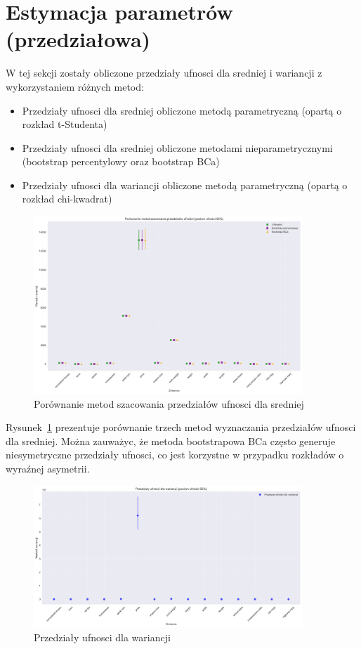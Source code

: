\documentclass[12pt,a4paper]{article}
\begin{document}
\section{Estymacja parametrów (przedziałowa)}

W tej sekcji zostały obliczone przedziały ufnosci dla sredniej i wariancji z wykorzystaniem różnych metod:
\begin{itemize}
    \item Przedziały ufnosci dla sredniej obliczone metodą parametryczną (opartą o rozkład t-Studenta)
    \item Przedziały ufnosci dla sredniej obliczone metodami nieparametrycznymi (bootstrap percentylowy oraz bootstrap BCa)
    \item Przedziały ufnosci dla wariancji obliczone metodą parametryczną (opartą o rozkład chi-kwadrat)
\end{itemize}

\begin{figure}[H]
    \centering
    \includegraphics[width=0.9\textwidth]{figures/ci_methods_comparison.png}
    \caption{Porównanie metod szacowania przedziałów ufnosci dla sredniej}
    \label{fig:ci_methods_comparison}
\end{figure}

Rysunek~\ref{fig:ci_methods_comparison} prezentuje porównanie trzech metod wyznaczania przedziałów ufnosci dla sredniej. Można zauważyc, że metoda bootstrapowa BCa często generuje niesymetryczne przedziały ufnosci, co jest korzystne w przypadku rozkładów o wyraźnej asymetrii.

\begin{figure}[H]
    \centering
    \includegraphics[width=0.9\textwidth]{figures/variance_ci.png}
    \caption{Przedziały ufnosci dla wariancji}
    \label{fig:variance_ci}
\end{figure}
\end{document}
